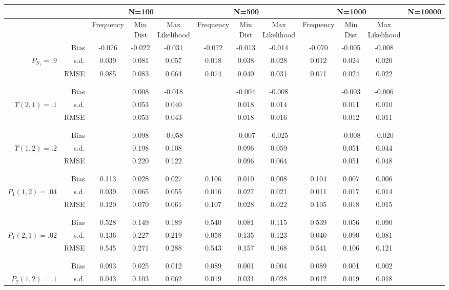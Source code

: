 \begin{tabular}{rr@{\hskip .3in}ccc@{\hskip .4in}ccc@{\hskip .4in}ccc}
\hline
& &  \multicolumn{3}{c}{N=100}&\multicolumn{3}{c}{N=500}&\multicolumn{3}{c}{N=1000}&\multicolumn{3}{c}{N=10000} \\
\hline
&   &Frequency & Min Dist & Max Likelihood &Frequency & Min Dist & Max Likelihood &Frequency & Min Dist & Max Likelihood \\
\hline
&Bias & -0.076&-0.022&-0.031&-0.072&-0.013&-0.014&-0.070&-0.005&-0.008 \\
$ P_{S_{1}}=.9 $& s.d. & 0.039&0.081&0.057&0.018&0.038&0.028&0.012&0.024&0.020 \\
&RMSE & 0.085&0.083&0.064&0.074&0.040&0.031&0.071&0.024&0.022 \\
\\\\&Bias & &0.008&-0.018&&-0.004&-0.008&&-0.003&-0.006 \\
$ \Upsilon(2,1)=.1 $& s.d. & &0.053&0.040&&0.018&0.014&&0.011&0.010 \\
&RMSE & &0.053&0.043&&0.018&0.016&&0.012&0.011 \\
\\\\&Bias & &0.098&-0.058&&-0.007&-0.025&&-0.008&-0.020 \\
$ \Upsilon(1,2)=.2 $& s.d. & &0.198&0.108&&0.096&0.059&&0.051&0.044 \\
&RMSE & &0.220&0.122&&0.096&0.064&&0.051&0.048 \\
\\\\&Bias & 0.113&0.028&0.027&0.106&0.010&0.008&0.104&0.007&0.006 \\
$ P_{1}(1,2)=.04 $& s.d. & 0.039&0.065&0.055&0.016&0.027&0.021&0.011&0.017&0.014 \\
&RMSE & 0.120&0.070&0.061&0.107&0.028&0.022&0.105&0.018&0.015 \\
\\\\&Bias & 0.528&0.149&0.189&0.540&0.081&0.115&0.539&0.056&0.090 \\
$ P_{1}(2,1)=.02 $& s.d. & 0.136&0.227&0.219&0.058&0.135&0.123&0.040&0.090&0.081 \\
&RMSE & 0.545&0.271&0.288&0.543&0.157&0.168&0.541&0.106&0.121 \\
\\\\&Bias & 0.093&0.025&0.012&0.089&0.001&0.004&0.089&0.001&0.002 \\
$ P_{2}(1,2)=.1 $& s.d. & 0.043&0.103&0.062&0.019&0.031&0.028&0.012&0.019&0.018 \\

\end{tabular}
